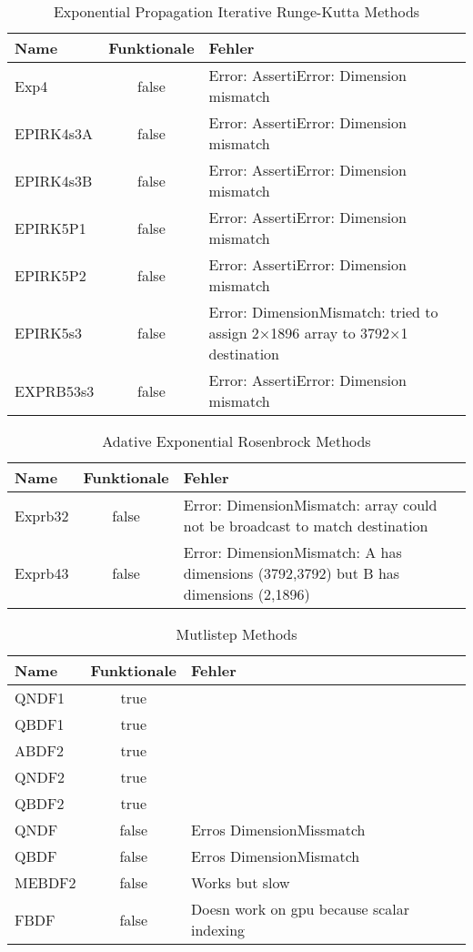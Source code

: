 \begin{table}[H]
    \centering

    \begin{tabular}{p{5cm}|c|p{5cm}}
        Name & Funktionale & Fehler \\
        \hline\hline
        Exp4      & false & Error: AssertiError: Dimension mismatch \\
        EPIRK4s3A & false & Error: AssertiError: Dimension mismatch \\
        EPIRK4s3B & false & Error: AssertiError: Dimension mismatch \\
        EPIRK5P1  & false & Error: AssertiError: Dimension mismatch \\
        EPIRK5P2  & false & Error: AssertiError: Dimension mismatch \\
        EPIRK5s3  & false & Error: DimensionMismatch: tried to assign 2×1896 array to 3792×1 destination \\
        EXPRB53s3 & false & Error: AssertiError: Dimension mismatch \\
    \end{tabular}
    \caption{Exponential Propagation Iterative Runge-Kutta Methods}
    \label{tab:my_label}
\end{table}

\begin{table}[H]
    \centering

    \begin{tabular}{p{5cm}|c|p{5cm}}
        Name & Funktionale & Fehler \\
        \hline\hline
        Exprb32 & false & Error: DimensionMismatch: array could not be broadcast to match destination \\
        Exprb43 & false & Error: DimensionMismatch: A has dimensions (3792,3792) but B has dimensions (2,1896) \\       
    \end{tabular}
    \caption{Adative Exponential Rosenbrock Methods}
    \label{tab:my_label}
\end{table}

\begin{table}[H]
    \centering

    \begin{tabular}{p{5cm}|c|p{5cm}}
        Name & Funktionale & Fehler \\
        \hline\hline
        QNDF1 & true   & \\
        QBDF1 & true   & \\
        ABDF2 & true   & \\
        QNDF2 & true   & \\
        QBDF2 & true   & \\
        QNDF  & false  & Erros DimensionMissmatch \\
        QBDF  & false  & Erros DimensionMismatch \\
        MEBDF2& false  & Works but slow \\
        FBDF  & false  & Doesn work on gpu because scalar indexing \\
    \end{tabular}
    \caption{Mutlistep Methods}
    \label{tab:my_label}
\end{table}

